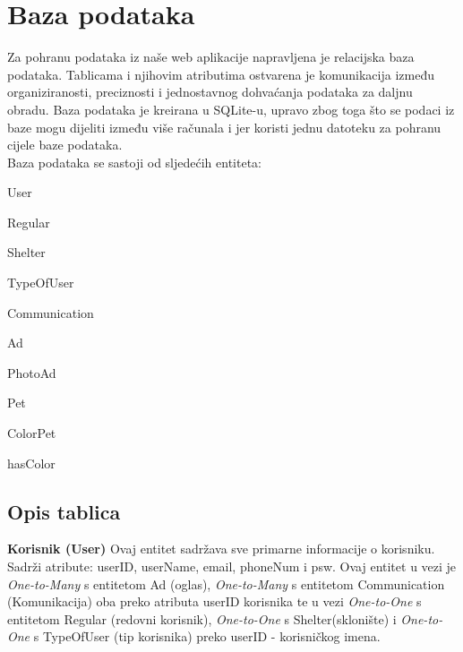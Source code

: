 	\pagebreak
				
		\section{Baza podataka}
			
			
		Za pohranu podataka iz naše web aplikacije napravljena je relacijska baza podataka. Tablicama i njihovim atributima ostvarena je komunikacija između organiziranosti, preciznosti i jednostavnog dohvaćanja podataka za daljnu obradu. Baza podataka je kreirana u SQLite-u, upravo zbog toga što se podaci iz baze mogu dijeliti između više računala i jer koristi jednu datoteku za pohranu cijele baze podataka.\\
		Baza podataka se sastoji od sljedećih entiteta:
		\begin{packed_item}
			\item User
			\item Regular
			\item Shelter
			\item TypeOfUser
			\item Communication
			\item Ad
			\item PhotoAd
			\item Pet
			\item ColorPet
			\item hasColor
		\end{packed_item}
		
			\subsection{Opis tablica}
			

				\textbf{Korisnik (User)}
				Ovaj entitet sadržava sve primarne informacije o korisniku. Sadrži atribute: userID, userName, email, phoneNum i psw. Ovaj entitet u vezi je \textit{One-to-Many} s entitetom Ad (oglas), \textit{One-to-Many} s entitetom Communication (Komunikacija) oba preko atributa userID korisnika te u vezi \textit{One-to-One} s entitetom Regular (redovni korisnik), \textit{One-to-One} s Shelter(sklonište) i \textit{One-to-One} s TypeOfUser (tip korisnika) preko userID - korisničkog imena.
				
